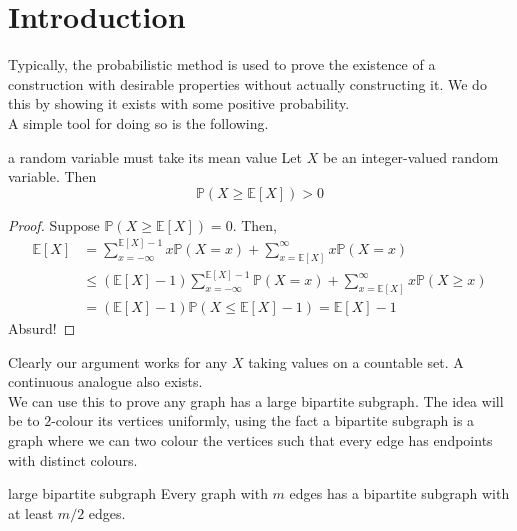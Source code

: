 \documentclass{article}
\begin{document}
\newpage

\tableofcontents

\newpage

\section{Introduction}

Typically, the probabilistic method is used to prove the existence of a construction with desirable properties 
without actually constructing it. We do this by showing it exists with some positive probability.   \\

A simple tool for doing so is the following. 

\begin{lemma}[]{a random variable must take its mean value}
    Let $X$ be an integer-valued random variable. Then \[\mathbb{P}(X \geq \mathbb{E}[X]) > 0\]
\end{lemma}

\begin{proof}
    Suppose $\mathbb{P}(X \geq \mathbb{E}[X]) = 0$. Then, 
    \begin{align*}
        \mathbb{E}[X] &= \sum_{x = - \infty}^{\mathbb{E}[X] - 1}x\mathbb{P}(X = x) + \sum_{x = \mathbb{E}[X]}^\infty 
        x\mathbb{P}(X = x) \\ &\leq (\mathbb{E}[X] - 1)\sum_{x = - \infty}^{\mathbb{E}[X] - 1}\mathbb{P}(X = x) + 
        \sum_{x = \mathbb{E}[X]}^\infty x\mathbb{P}(X \geq x) \\ &= (\mathbb{E}[X] - 1)\mathbb{P}(X \leq \mathbb{E}[X] - 1)
        = \mathbb{E}[X] - 1
    \end{align*}
    Absurd!
\end{proof}

Clearly our argument works for any $X$ taking values on a countable set. A continuous analogue also exists. \\ 

We can use this to prove any graph has a large bipartite subgraph. The idea will be to $2$-colour its vertices 
uniformly, using the fact a bipartite subgraph is a graph where we can two colour the vertices such that 
every edge has endpoints with distinct colours. 

\begin{proposition}[]{large bipartite subgraph}
    Every graph with $m$ edges has a bipartite subgraph with at least $m/2$ edges.
\end{proposition}
\end{document}
